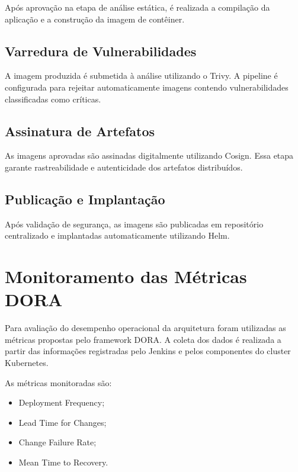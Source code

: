 Após aprovação na etapa de análise estática, é realizada a compilação da aplicação e a construção da imagem de contêiner.

\subsection{Varredura de Vulnerabilidades}

A imagem produzida é submetida à análise utilizando o Trivy. A pipeline é configurada para rejeitar automaticamente imagens contendo vulnerabilidades classificadas como críticas.

\subsection{Assinatura de Artefatos}

As imagens aprovadas são assinadas digitalmente utilizando Cosign. Essa etapa garante rastreabilidade e autenticidade dos artefatos distribuídos.

\subsection{Publicação e Implantação}

Após validação de segurança, as imagens são publicadas em repositório centralizado e implantadas automaticamente utilizando Helm.

\section{Monitoramento das Métricas DORA}

Para avaliação do desempenho operacional da arquitetura foram utilizadas as métricas propostas pelo framework DORA. A coleta dos dados é realizada a partir das informações registradas pelo Jenkins e pelos componentes do cluster Kubernetes.

As métricas monitoradas são:

\begin{itemize}
    \item Deployment Frequency;
    \item Lead Time for Changes;
    \item Change Failure Rate;
    \item Mean Time to Recovery.
\end{itemize}

